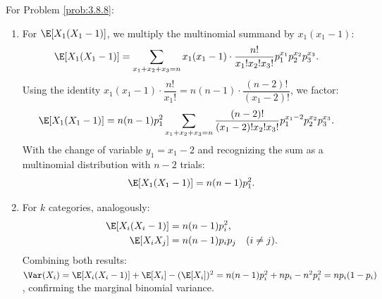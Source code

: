 \begin{solucion}
	\label{sol:3.8.8}
	For Problem \ref{prob:3.8.8}:
	\begin{enumerate}
		\item For $\E[X_{1}(X_{1}-1)]$, we multiply the multinomial summand by $x_{1}(x_{1}-1)$:
		\begin{align*}
			\E[X_{1}(X_{1}-1)] &= \sum_{x_{1}+x_{2}+x_{3}=n} x_{1}(x_{1}-1) \cdot \dfrac{n!}{x_{1}! x_{2}! x_{3}!} p_{1}^{x_{1}} p_{2}^{x_{2}} p_{3}^{x_{3}}.
		\end{align*}
		Using the identity $x_{1}(x_{1}-1) \cdot \dfrac{n!}{x_{1}!} = n(n-1) \cdot \dfrac{(n-2)!}{(x_{1}-2)!}$, we factor:
		\begin{align*}
			\E[X_{1}(X_{1}-1)] &= n(n-1) p_{1}^{2} \sum_{x_{1}+x_{2}+x_{3}=n} \dfrac{(n-2)!}{(x_{1}-2)! x_{2}! x_{3}!} p_{1}^{x_{1}-2} p_{2}^{x_{2}} p_{3}^{x_{3}}.
		\end{align*}
		With the change of variable $y_{1} = x_{1} - 2$ and recognizing the sum as a multinomial distribution with $n - 2$ trials:
		\begin{align*}
			\E[X_{1}(X_{1}-1)] = n(n-1) p_{1}^{2}.
		\end{align*}
		\item For $k$ categories, analogously:
		\begin{align*}
			\E[X_{i}(X_{i}-1)] &= n(n-1) p_{i}^{2}, \\
			\E[X_{i} X_{j}] &= n(n-1) p_{i} p_{j} \quad (i \neq j).
		\end{align*}
		Combining both results: $\Var(X_{i}) = \E[X_{i}(X_{i}-1)] + \E[X_{i}] - (\E[X_{i}])^{2} = n(n-1)p_{i}^{2} + np_{i} - n^{2}p_{i}^{2} = np_{i}(1-p_{i})$, confirming the marginal binomial variance. \qedhere
	\end{enumerate}
\end{solucion}

